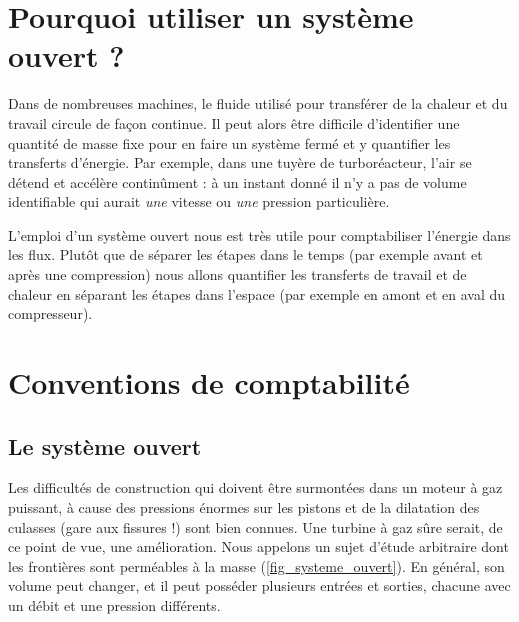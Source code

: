 \section{Pourquoi utiliser un système ouvert ?}

	Dans de nombreuses machines, le fluide utilisé pour transférer de la chaleur et du travail circule de façon continue. Il peut alors être difficile d’identifier une quantité de masse fixe pour en faire un système fermé et y quantifier les transferts d’énergie. Par exemple, dans une tuyère de turboréacteur, l’air se détend et accélère continûment : à un instant donné il n’y a pas de volume identifiable qui aurait \emph{une} vitesse ou \emph{une} pression particulière.
	
	L’emploi d’un système ouvert nous est très utile pour comptabiliser l’énergie dans les flux. Plutôt que de séparer les étapes dans le temps (par exemple avant et après une compression) nous allons quantifier les transferts de travail et de chaleur en séparant les étapes dans l’espace (par exemple en amont et en aval du compresseur).

\section{Conventions de comptabilité}
\label{ch_conventions_compta_so}

	\subsection{Le système ouvert}
	\label{ch_convention_signe_sf}

			Les difficultés de construction qui doivent être surmontées dans un moteur à gaz puissant, à cause des pressions énormes sur les pistons et de la dilatation des culasses (gare aux fissures !) sont bien connues. Une turbine à gaz sûre serait, de ce point de vue, une amélioration.
		Nous appelons  un sujet d’étude arbitraire dont les frontières sont perméables à la masse (\cref{fig_systeme_ouvert}). En général, son volume peut changer, et il peut posséder plusieurs entrées et sorties, chacune avec un débit et une pression différents.


